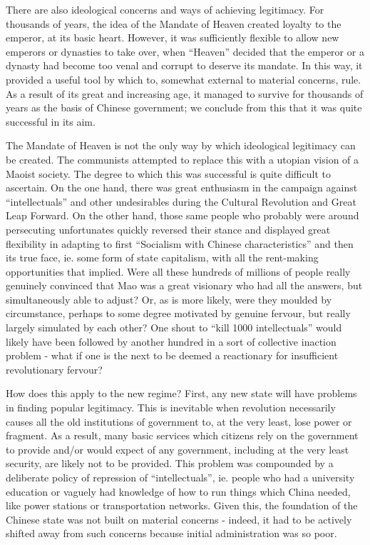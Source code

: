 \documentclass[11pt,a4paper]{report}
\begin{document}
\begin{multicols}{2}
There are also ideological concerns and ways of achieving legitimacy. For thousands of years, the idea of the Mandate of Heaven created loyalty to the emperor, at its basic heart. However, it was sufficiently flexible to allow new emperors or dynasties to take over, when ``Heaven'' decided that the emperor or a dynasty had become too venal and corrupt to deserve its mandate. In this way, it provided a useful tool by which to, somewhat external to material concerns, rule. As a result of its great and increasing age, it managed to survive for thousands of years as the basis of Chinese government; we conclude from this that it was quite successful in its aim. 

The Mandate of Heaven is not the only way by which ideological legitimacy can be created. The communists attempted to replace this with a utopian vision of a Maoist society. The degree to which this was successful is quite difficult to ascertain. On the one hand, there was great enthusiasm in the campaign against ``intellectuals'' and other undesirables during the Cultural Revolution and Great Leap Forward. On the other hand, those same people who probably were around persecuting unfortunates quickly reversed their stance and displayed great flexibility in adapting to first ``Socialism with Chinese characteristics'' and then its true face, ie. some form of state capitalism, with all the rent-making opportunities that implied. Were all these hundreds of millions of people really genuinely convinced that Mao was a great visionary who had all the answers, but simultaneously able to adjust? Or, as is more likely, were they moulded by circumstance, perhaps to some degree motivated by genuine fervour, but really largely simulated by each other? One shout to ``kill 1000 intellectuals'' would likely have been followed by another hundred in a sort of collective inaction problem - what if one is the next to be deemed a reactionary for insufficient revolutionary fervour?

How does this apply to the new regime? First, any new state will have problems in finding popular legitimacy. This is inevitable when revolution necessarily causes all the old institutions of government to, at the very least, lose power or fragment. As a result, many basic services which citizens rely on the government to provide and/or would expect of any government, including at the very least security, are likely not to be provided. This problem was compounded by a deliberate policy of repression of ``intellectuals'', ie. people who had a university education or vaguely had knowledge of how to run things which China needed, like power stations or transportation networks. Given this, the foundation of the Chinese state was not built on material concerns - indeed, it had to be actively shifted away from such concerns because initial administration was so poor.


\end{multicols}
\end{document}
